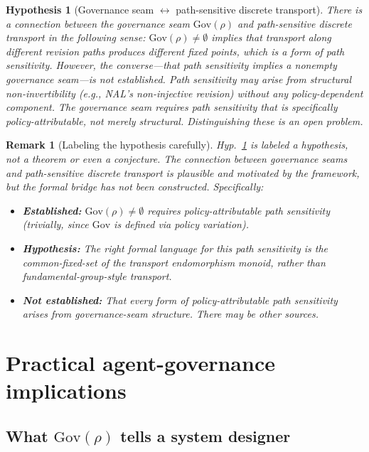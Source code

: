 \documentclass[11pt]{article}
\newtheorem{remark}{Remark}
\newtheorem{hypothesis}{Hypothesis}
\newcommand{\Gov}{\mathrm{Gov}}
\begin{document}
\begin{hypothesis}[Governance seam $\leftrightarrow$ path-sensitive discrete transport]
\label{hyp:gov-path-sensitive}
There is a connection between the governance seam $\Gov(\rho)$ and path-sensitive discrete
transport in the following sense: $\Gov(\rho) \neq \emptyset$ implies that transport along
different revision paths produces different fixed points, which is a form of path sensitivity.
However, the converse---that path sensitivity implies a nonempty governance seam---is
\emph{not} established. Path sensitivity may arise from structural non-invertibility (e.g.,
NAL's non-injective revision) without any policy-dependent component. The governance seam
requires path sensitivity that is specifically \emph{policy-attributable}, not merely
structural. Distinguishing these is an open problem.
\end{hypothesis}

\begin{remark}[Labeling the hypothesis carefully]
Hyp.~\ref{hyp:gov-path-sensitive} is labeled a \emph{hypothesis}, not a theorem or even a
conjecture. The connection between governance seams and path-sensitive discrete transport is
plausible and motivated by the framework, but the formal bridge has not been constructed.
Specifically:
\begin{itemize}
  \item \textbf{Established:} $\Gov(\rho) \neq \emptyset$ requires policy-attributable path
        sensitivity (trivially, since $\Gov$ is defined via policy variation).
  \item \textbf{Hypothesis:} The right formal language for this path sensitivity is the
        common-fixed-set of the transport endomorphism monoid, rather than
        fundamental-group-style transport.
  \item \textbf{Not established:} That every form of policy-attributable path sensitivity
        arises from governance-seam structure. There may be other sources.
\end{itemize}
\end{remark}

\section{Practical agent-governance implications}
\label{sec:practical}

\subsection{What $\Gov(\rho)$ tells a system designer}
\end{document}
